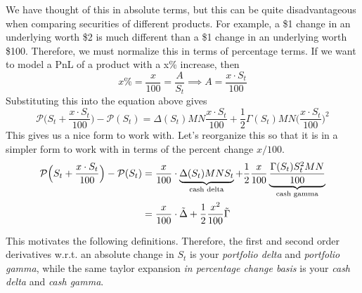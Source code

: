 \documentclass{article}
\begin{document}
    We have thought of this in absolute terms, but this can be quite disadvantageous when comparing securities of different products. For example, a \$1 change in an underlying worth \$2 is much different than a \$1 change in an underlying worth \$100. Therefore, we must normalize this in terms of percentage terms. If we want to model a PnL of a product with a x\% increase, then
    \begin{equation}
      x\% = \frac{x}{100} = \frac{A}{S_t} \implies A = \frac{x \cdot S_t}{100}
    \end{equation}
    Substituting this into the equation above gives
    \begin{equation}
      \mathcal{P}\Big(S_t + \frac{x \cdot S_t}{100} \Big) - \mathcal{P} (S_t) = \Delta (S_t) M N \frac{x \cdot S_t}{100} + \frac{1}{2} \Gamma (S_t) M N \bigg( \frac{x \cdot S_t}{100} \bigg)^2
    \end{equation}
    This gives us a nice form to work with. Let's reorganize this so that it is in a simpler form to work with in terms of the percent change $x/100$.
    \begin{align}
      \mathcal{P}\Big(S_t + \frac{x \cdot S_t}{100} \Big) - \mathcal{P} (S_t) & = \frac{x}{100} \cdot \underbrace{\Delta (S_t) M N S_t}_{\text{cash delta}} + \frac{1}{2} \frac{x}{100} \underbrace{\frac{\Gamma (S_t) S_t^2 M N}{100}}_{\text{cash gamma}}  \\
      & = \frac{x}{100} \cdot \Tilde{\Delta} + \frac{1}{2} \frac{x^2}{100} \Tilde{\Gamma}
    \end{align}

    This motivates the following definitions. Therefore, the first and second order derivatives w.r.t. an absolute change in $S_t$ is your \textit{portfolio delta} and \textit{portfolio gamma}, while the same taylor expansion \textit{in percentage change basis} is your \textit{cash delta} and \textit{cash gamma}.
\end{document}
